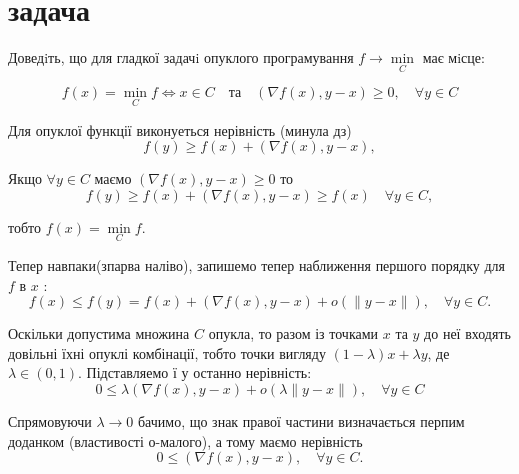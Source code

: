 \section{задача}

\begin{tcolorbox}[title=Умова]
    Доведiть, що для гладкої задачi опуклого програмування $f \rightarrow \min\limits_C$ має мiсце:

    $$ f(x) = \min\limits_C f \Leftrightarrow x \in C \quad 
    \text{та} \quad (\nabla f(x),  y - x) \geq 0, \quad \forall y \in C$$
\end{tcolorbox}

Для опуклої функції виконуеться нерівність (минула дз)
$$
f(y) \geq f(x)+(\nabla f(x), y-x),
$$

Якщо $\forall y \in C$ маємо $(\nabla f(x), y-x) \geq 0$ то
$$
f(y) \geq f(x)+(\nabla f(x), y-x) \geq f(x) \quad \forall y \in C,
$$

тобто $f(x)=\min\limits_C f$.


Тепер навпаки(зпарва наліво), запишемо тепер наближення першого порядку для $f$ в $x$ :
$$
f(x) \leq f(y)=f(x)+(\nabla f(x), y-x)+o(\|y-x\|), \quad \forall y \in C .
$$

Оскільки допустима множина $C$ опукла, то разом із точками $x$ та $y$ до неї входять довільні їхні опуклі комбінації, тобто точки вигляду $(1-\lambda) x+\lambda y$, де $\lambda \in(0,1)$. Підставляемо ї у останно нерівність:
$$
0 \leq \lambda(\nabla f(x), y-x)+o(\lambda\|y-x\|), \quad \forall y \in C
$$

Спрямовуючи $\lambda \rightarrow 0$ бачимо, що знак правої частини визначається перпим доданком (властивості о-малого), а тому маємо нерівність
$$
0 \leq(\nabla f(x), y-x), \quad \forall y \in C .
$$